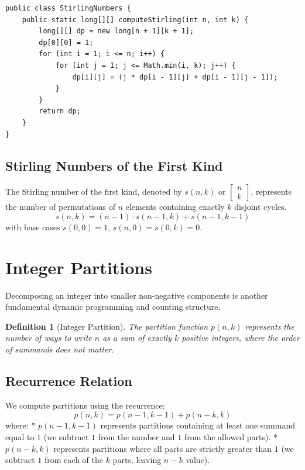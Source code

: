 \documentclass[10pt,journal,compsoc,onecolumn]{IEEEtran}
\newtheorem{definition}[theorem]{Definition}
\begin{document}
\begin{verbatim}
public class StirlingNumbers {
    public static long[][] computeStirling(int n, int k) {
        long[][] dp = new long[n + 1][k + 1];
        dp[0][0] = 1;
        for (int i = 1; i <= n; i++) {
            for (int j = 1; j <= Math.min(i, k); j++) {
                dp[i][j] = (j * dp[i - 1][j] + dp[i - 1][j - 1]);
            }
        }
        return dp;
    }
}
\end{verbatim}

\subsection{Stirling Numbers of the First Kind}

The Stirling number of the first kind, denoted by $s(n, k)$ or $\left[ \begin{matrix} n \\ k \end{matrix} \right]$, represents the number of permutations of $n$ elements containing exactly $k$ disjoint cycles.
\begin{equation}
s(n, k) = (n - 1) \cdot s(n - 1, k) + s(n - 1, k - 1)
\end{equation}
with base cases $s(0,0)=1$, $s(n,0)=s(0,k)=0$.

\section{Integer Partitions}
\label{sec:integer_partitions}

Decomposing an integer into smaller non-negative components is another fundamental dynamic programming and counting structure.

\begin{definition}[Integer Partition]
The partition function $p(n, k)$ represents the number of ways to write $n$ as a sum of exactly $k$ positive integers, where the order of summands does not matter.
\end{definition}

\subsection{Recurrence Relation}
We compute partitions using the recurrence:
\begin{equation}
p(n, k) = p(n - 1, k - 1) + p(n - k, k)
\end{equation}
where:
* $p(n-1, k-1)$ represents partitions containing at least one summand equal to $1$ (we subtract $1$ from the number and $1$ from the allowed parts).
* $p(n-k, k)$ represents partitions where all parts are strictly greater than $1$ (we subtract $1$ from each of the $k$ parts, leaving $n-k$ value).
\end{document}
